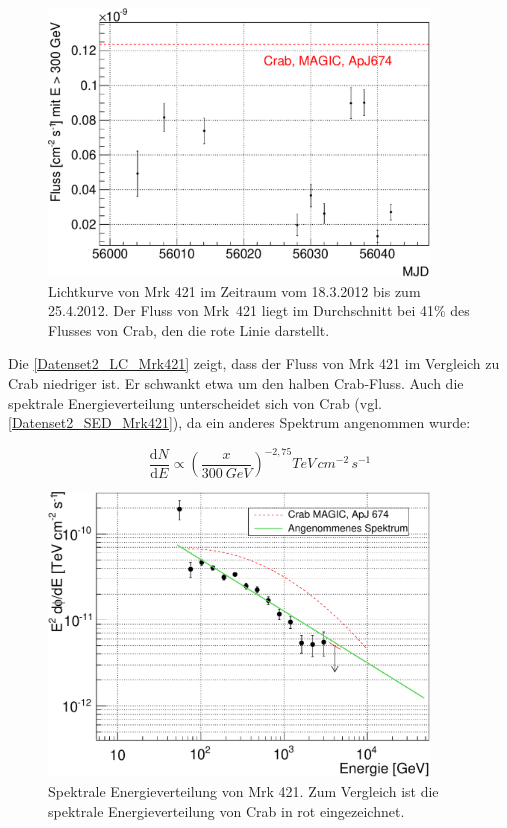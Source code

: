 \begin{figure}
    \centering
    \includegraphics[width=0.9\textwidth]{./Plots/04_MrkAnalyse/Datenset2/LC_Mrk421.pdf}
    \caption{Lichtkurve von Mrk 421 im Zeitraum vom 18.3.2012 bis zum 25.4.2012.
    Der Fluss von Mrk~421 liegt im Durchschnitt bei 41\% des Flusses von Crab, den die rote Linie darstellt.}
    \label{Datenset2_LC_Mrk421}
\end{figure}

Die \autoref{Datenset2_LC_Mrk421} zeigt, dass der Fluss von Mrk 421 im Vergleich zu Crab niedriger ist.
Er schwankt etwa um den halben Crab-Fluss.
Auch die spektrale Energieverteilung unterscheidet sich von Crab (vgl. \autoref{Datenset2_SED_Mrk421}), da ein anderes Spektrum angenommen wurde:

\begin{equation}
\frac{\mathrm{d}N}{\mathrm{d}E}\propto \left(\frac{x}{\SI{300}{GeV}}\right)^{-2,75}\si{TeV\,cm^{-2}\,s^{-1}}
\end{equation}


\begin{figure}
    \centering
    \includegraphics[width=0.9\textwidth]{./Plots/04_MrkAnalyse/Datenset2/SED_Mrk421.pdf}
    \caption{Spektrale Energieverteilung von Mrk 421.
    Zum Vergleich ist die spektrale Energieverteilung von Crab in rot eingezeichnet.}
    \label{Datenset2_SED_Mrk421}
\end{figure}


